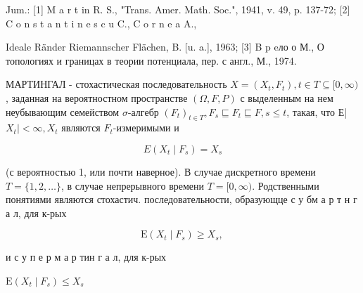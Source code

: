 \documentclass[10pt]{article}
\begin{document}
Jum.: [1] M a r t in R. S., "Trans. Amer. Math. Soc.", 1941, v. 49, p. 137-72; [2] C o n s t a n t i n e s c u C., C o r n e a A.,

Ideale Ränder Riemannscher Flächen, B. [u. a.], 1963; [3] B p eло о М., О топологиях и границах в теории потенциала, пер. с англ., М., 1974.



МАРТИНГАЛ - стохастическая последовательность $X=\left(X_{t}, F_{t}\right), t \in T \subseteq[0, \infty)$, заданная на вероятностном пространстве $(\Omega, F, P)$ с выделенным на нем неубывающим семейством $\sigma$-алгебр $\left(F_{t}\right)_{t \in T}, F_{s} \sqsubseteq F_{t} \sqsubseteq F, s \leqslant t$, такая, что Е| $X_{t} \mid<\infty, X_{t}$ являются $F_{t}$-измеримыми и



\[

E\left(X_{t} \mid F_{s}\right)=X_{s}

\]



(с вероятностью 1, или почти наверное). В случае дискретного времени $T=\{1,2, \ldots\}$, в случае непрерывного времени $T=[0, \infty)$. Родственными понятиями являются стохастич. последовательности, образующце с у бм а р т н г а л, для к-рых



\[

\mathrm{E}\left(X_{t} \mid F_{s}\right) \geqslant X_{s} \text {, }

\]



и с у п е р м а р тин г а л, для к-рых



$\mathrm{E}\left(X_{t} \mid F_{s}\right) \leqslant X_{s}$
\end{document}
